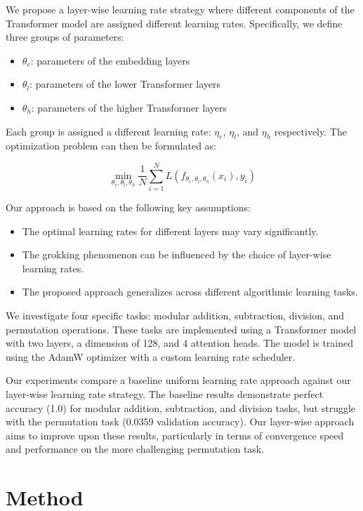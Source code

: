 \documentclass{article} %
\begin{document}
We propose a layer-wise learning rate strategy where different components of the Transformer model are assigned different learning rates. Specifically, we define three groups of parameters:
\begin{itemize}
    \item $\theta_e$: parameters of the embedding layers
    \item $\theta_l$: parameters of the lower Transformer layers
    \item $\theta_h$: parameters of the higher Transformer layers
\end{itemize}

Each group is assigned a different learning rate: $\eta_e$, $\eta_l$, and $\eta_h$ respectively. The optimization problem can then be formulated as:

\begin{equation}
    \min_{\theta_e, \theta_l, \theta_h} \frac{1}{N} \sum_{i=1}^N L(f_{\theta_e, \theta_l, \theta_h}(x_i), y_i)
\end{equation}

Our approach is based on the following key assumptions:
\begin{itemize}
    \item The optimal learning rates for different layers may vary significantly.
    \item The grokking phenomenon can be influenced by the choice of layer-wise learning rates.
    \item The proposed approach generalizes across different algorithmic learning tasks.
\end{itemize}

We investigate four specific tasks: modular addition, subtraction, division, and permutation operations. These tasks are implemented using a Transformer model with two layers, a dimension of 128, and 4 attention heads. The model is trained using the AdamW optimizer \cite{loshchilov2017adamw} with a custom learning rate scheduler.

Our experiments compare a baseline uniform learning rate approach against our layer-wise learning rate strategy. The baseline results demonstrate perfect accuracy (1.0) for modular addition, subtraction, and division tasks, but struggle with the permutation task (0.0359 validation accuracy). Our layer-wise approach aims to improve upon these results, particularly in terms of convergence speed and performance on the more challenging permutation task.

\section{Method}
\label{sec:method}
\end{document}
